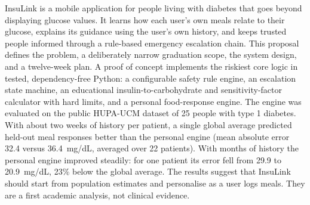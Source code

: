 InsuLink is a mobile application for people living with diabetes that goes beyond displaying glucose values. It learns how each user's own meals relate to their glucose, explains its guidance using the user's own history, and keeps trusted people informed through a rule-based emergency escalation chain. This proposal defines the problem, a deliberately narrow graduation scope, the system design, and a twelve-week plan. A proof of concept implements the riskiest core logic in tested, dependency-free Python: a configurable safety rule engine, an escalation state machine, an educational insulin-to-carbohydrate and sensitivity-factor calculator with hard limits, and a personal food-response engine. The engine was evaluated on the public HUPA-UCM dataset of 25 people with type 1 diabetes. With about two weeks of history per patient, a single global average predicted held-out meal responses better than the personal engine (mean absolute error 32.4 versus 36.4~mg/dL, averaged over 22 patients). With months of history the personal engine improved steadily: for one patient its error fell from 29.9 to 20.9~mg/dL, 23\% below the global average. The results suggest that InsuLink should start from population estimates and personalise as a user logs meals. They are a first academic analysis, not clinical evidence.
